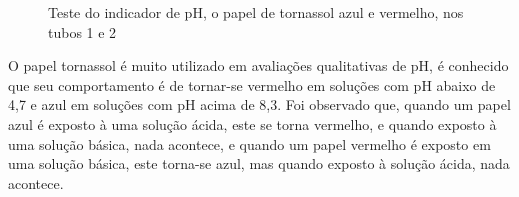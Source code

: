 \begin{figure}[h]
            \caption{Teste do indicador de pH, o papel de tornassol azul e vermelho, nos tubos 1 e 2}\label{fig:experimento11}
        \end{figure}

        \indent O papel tornassol é muito utilizado em avaliações qualitativas de pH, é conhecido que seu comportamento é de tornar-se vermelho em soluções com pH abaixo de 4,7 e azul em soluções com pH acima de 8,3. Foi observado que, quando um papel azul é exposto à uma solução ácida, este se torna vermelho, e quando exposto à uma solução básica, nada acontece, e quando um papel vermelho é exposto em uma solução básica, este torna-se azul, mas quando exposto à solução ácida, nada acontece.\\
        
